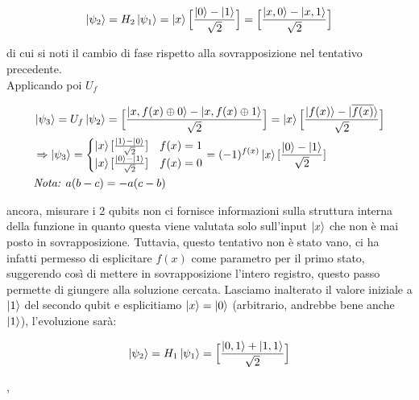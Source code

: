 \documentclass[12pt,a4paper,openright]{report}
\newcommand*\xor{\mathbin{\oplus}}
\begin{document}
 \begin{center}
    \begin{align*}
        \ket{\psi_2} = H_2\ket{\psi_1} = \ket{x}\Big[  \frac{\ket{0} - \ket{1}}{\sqrt2} \Big] = \Big[  \frac{\ket{x,0} - \ket{x,1}}{\sqrt2} \Big]                                                                                   
    \end{align*}
\end{center}

di cui si noti il cambio di fase rispetto alla sovrapposizione nel tentativo precedente. \\
Applicando poi $U_f$

\begin{center}
    \begin{align*}
        &\ket{\psi_3} = U_f\ket{\psi_2} = \Big[  \frac{\ket{x,f(x) \xor 0} - \ket{x,f(x) \xor 1}}{\sqrt2} \Big] = \ket{x} \Big[\frac{\ket{f(x)} - \ket{\overline{f(x)}} } {\sqrt2} \Big]    \\
        & \Rightarrow   \ket{\psi_3} =  
        \begin{cases} 
              \ket{x}[\frac{\ket{1} - \ket{0}}{\sqrt{2}}] 
                      & f(x) = 1\\
              \ket{x}[\frac{\ket{0} - \ket{1}}{\sqrt{2}}] 
                         & f(x) = 0
          \end{cases} = 
          (-1)^{f(x)}\ket{x}[\frac{\ket{0} - \ket{1}}{\sqrt{2}}] \\
        & \textit{Nota: $a(b-c) = -a(c-b)$}  
    \end{align*}
\end{center}
ancora, misurare i 2 qubits non ci fornisce informazioni sulla struttura interna della funzione in quanto questa viene valutata solo sull'input $\ket{x}$ che non è mai posto in sovrapposizione.
Tuttavia, questo tentativo non è stato vano, ci ha infatti permesso di esplicitare $f(x)$ come parametro per il primo stato, suggerendo così di mettere in sovrapposizione l'intero registro, questo passo 
permette di giungere alla soluzione cercata. Lasciamo inalterato il valore iniziale a $\ket1$ del secondo qubit e esplicitiamo $\ket{x}=\ket{0}$ (arbitrario, andrebbe bene anche $\ket1$), l'evoluzione sarà:

\begin{center}
    \begin{align*}
        \ket{\psi_2} = H_1\ket{\psi_1} = \Big[  \frac{\ket{0,1} + \ket{1,1}}{\sqrt2} \Big]  
    \end{align*}
\end{center}
,
\end{document}
